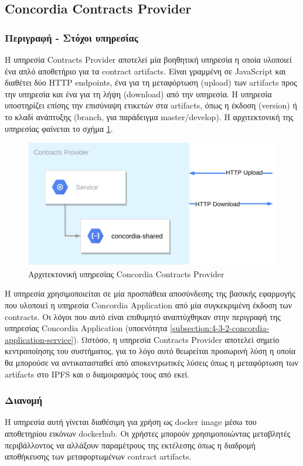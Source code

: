 \subsection{Concordia Contracts Provider} \label{subsection:4-3-5-concordia-contracts-provider-service}

\subsubsection{Περιγραφή - Στόχοι υπηρεσίας}

Η υπηρεσία Contracts Provider αποτελεί μία βοηθητική υπηρεσία η οποία υλοποιεί ένα απλό αποθετήριο για τα contract artifacts. Είναι γραμμένη σε JavaScript και διαθέτει δύο HTTP \textenglish{endpoints}, ένα για τη μεταφόρτωση (upload) των artifacts προς την υπηρεσία και ένα για τη λήψη (download) από την υπηρεσία. Η υπηρεσία υποστηρίζει επίσης την επισύναψη ετικετών στα artifacts, όπως η έκδοση (version) ή το κλαδί ανάπτυξης (branch, για παράδειγμα \textenglish{master/develop}). Η αρχιτεκτονική της υπηρεσίας φαίνεται το σχήμα \ref{figure:4-3-concordia-contracts-provider-architecture}.

\begin{figure}[H]
    \centering
    \includegraphics[width=.6\textwidth]{assets/figures/chapter-4/4.3.architecture-4.3.5.concordia-contracts-provider-architecture}
    \caption{Αρχιτεκτονική υπηρεσίας Concordia Contracts Provider}
    \label{figure:4-3-concordia-contracts-provider-architecture}
\end{figure}

Η υπηρεσία χρησιμοποιείται σε μία προσπάθεια αποσύνδεσης της βασικής εφαρμογής που υλοποιεί η υπηρεσία Concordia Application από μία συγκεκριμένη έκδοση των contracts. Οι λόγοι που αυτό είναι επιθυμητό αναπτύχθηκαν στην περιγραφή της υπηρεσίας Concordia \textenglish{Application} (υποενότητα \ref{subsection:4-3-2-concordia-application-service}). Ωστόσο, η υπηρεσία Contracts Provider αποτελεί σημείο κεντροποίησης του συστήματος, για το λόγο αυτό θεωρείται προσωρινή λύση η οποία θα μπορούσε να αντικατασταθεί από αποκεντρωτικές λύσεις όπως η μεταφόρτωση των artifacts στο IPFS και ο διαμοιρασμός τους από εκεί.

\subsubsection{Διανομή}

Η υπηρεσία αυτή γίνεται διαθέσιμη για χρήση ως docker image μέσω του αποθετηρίου εικόνων dockerhub. Οι χρήστες μπορούν χρησιμοποιώντας μεταβλητές περιβάλλοντος να αλλάξουν παραμέτρους της εκτέλεσης όπως η διαδρομή αποθήκευσης των μεταφορτωμένων contract artifacts.